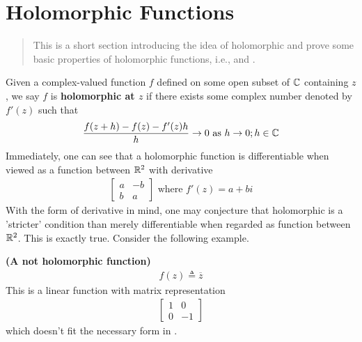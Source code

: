 \documentclass{report}
\begin{document}
\section{Holomorphic Functions}
\begin{abstract}
This is a short section introducing the idea of holomorphic and prove some basic properties of holomorphic functions, i.e.,  and . 
\end{abstract}
\begin{mdframed}
Given a complex-valued function $f$ defined on some open subset of  $\mathbb{C}$ containing  $z$, we say  $f$ is \textbf{holomorphic at $z$} if there exists some complex number denoted by $f'(z)$ such that 
\begin{align*}
\frac{f(z+h)-f(z)-f'(z)h}{h}\to 0\text{ as }h\to 0;h\in\mathbb{C}
\end{align*}
Immediately, one can see that a holomorphic function is differentiable when viewed as a function between $\mathbb{R}^2$ with derivative 
\begin{align}
\label{cd}
  \begin{bmatrix}
    a & -b \\
    b & a
  \end{bmatrix}\text{ where }f'(z)=a+b i
\end{align}
With the form of derivative in mind, one may conjecture that holomorphic is a 'stricter' condition than merely differentiable when regarded as function between $\mathbb{R}^2$. This is exactly true. Consider the following example.
\end{mdframed}
\begin{Example}{\textbf{(A not holomorphic function)}}{}
\begin{align*}
f(z)\triangleq \overline{z}
\end{align*}
This is a linear function with matrix representation 
\begin{align*}
\begin{bmatrix}
  1&0 \\
  0& -1
\end{bmatrix}
\end{align*}
which doesn't fit the necessary form in .
\end{Example}
\end{document}

